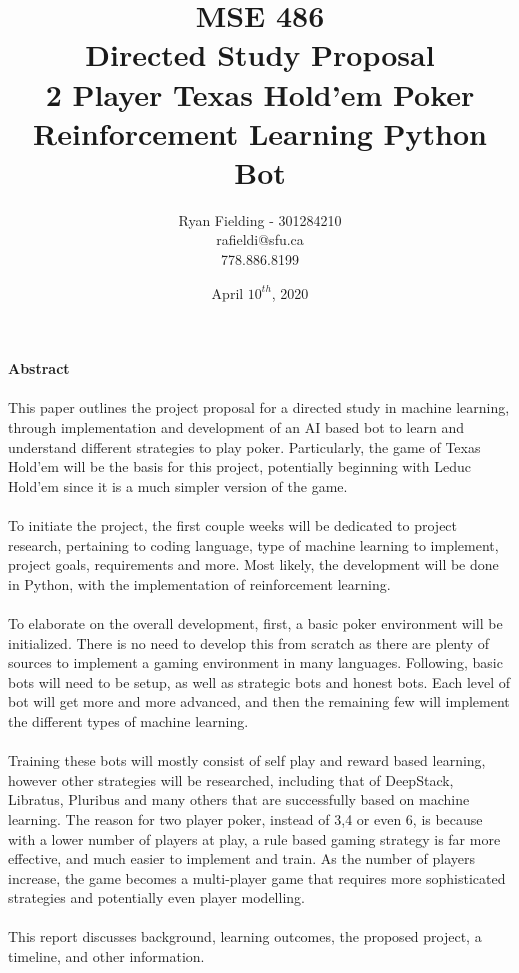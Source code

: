 \documentclass[12pt]{article}
\title{MSE 486\\Directed Study Proposal\\ \bigskip \textbf{2 Player Texas Hold'em Poker\\Reinforcement Learning Python Bot}}
\author{Ryan Fielding - 301284210\\rafieldi@sfu.ca\\778.886.8199}
\date{April $10^{th}$, 2020}
\begin{document}
\maketitle
\newpage

{\Large \textbf{Abstract\\\\}}
This paper outlines the project proposal for a directed study in machine learning, through implementation and development of an AI based bot to learn and understand different strategies to play poker. Particularly, the game of Texas Hold'em will be the basis for this project, potentially beginning with Leduc Hold'em since it is a much simpler version of the game.\\\\
To initiate the project, the first couple weeks will be dedicated to project research, pertaining to coding language, type of machine learning to implement, project goals, requirements and more. Most likely, the development will be done in Python, with the implementation of reinforcement learning.\\\\
To elaborate on the overall development, first, a basic poker environment will be initialized. There is no need to develop this from scratch as there are plenty of sources to implement a gaming environment in many languages. Following, basic bots will need to be setup, as well as strategic bots and honest bots. Each level of bot will get more and more advanced, and then the remaining few will implement the different types of machine learning.\\\\
Training these bots will mostly consist of self play and reward based learning, however other strategies will be researched, including that of DeepStack, Libratus, Pluribus and many others that are successfully based on machine learning. The reason for two player poker, instead of 3,4 or even 6, is because with a lower number of players at play, a rule based gaming strategy is far more effective, and much easier to implement and train. As the number of players increase, the game becomes a multi-player game that requires more sophisticated strategies and potentially even player modelling.\\\\
This report discusses background, learning outcomes, the proposed project, a timeline, and other information. 

\newpage
\end{document}
